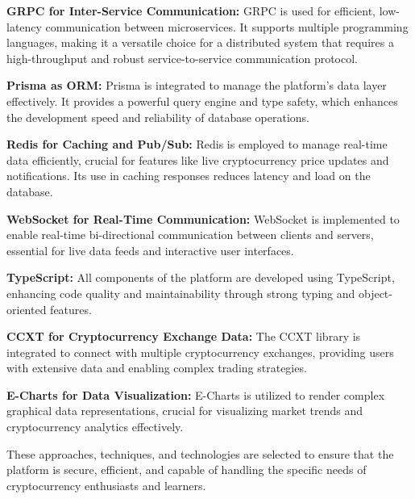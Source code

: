 \documentclass[12pt]{report}
\begin{document}
\textbf{GRPC for Inter-Service Communication:} GRPC is used for efficient, low-latency communication between microservices. It supports multiple programming languages, making it a versatile choice for a distributed system that requires a high-throughput and robust service-to-service communication protocol.

\textbf{Prisma as ORM:} Prisma is integrated to manage the platform’s data layer effectively. It provides a powerful query engine and type safety, which enhances the development speed and reliability of database operations.

\textbf{Redis for Caching and Pub/Sub:} Redis is employed to manage real-time data efficiently, crucial for features like live cryptocurrency price updates and notifications. Its use in caching responses reduces latency and load on the database.

\textbf{WebSocket for Real-Time Communication:} WebSocket is implemented to enable real-time bi-directional communication between clients and servers, essential for live data feeds and interactive user interfaces.

\textbf{TypeScript:} All components of the platform are developed using TypeScript, enhancing code quality and maintainability through strong typing and object-oriented features.

\textbf{CCXT for Cryptocurrency Exchange Data:} The CCXT library is integrated to connect with multiple cryptocurrency exchanges, providing users with extensive data and enabling complex trading strategies.

\textbf{E-Charts for Data Visualization:} E-Charts is utilized to render complex graphical data representations, crucial for visualizing market trends and cryptocurrency analytics effectively.

These approaches, techniques, and technologies are selected to ensure that the platform is secure, efficient, and capable of handling the specific needs of cryptocurrency enthusiasts and learners.
\end{document}
